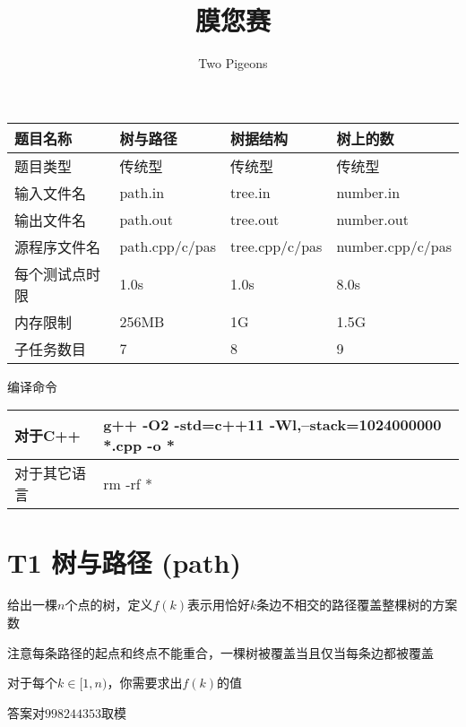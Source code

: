 \documentclass[12pt]{article}
\title{{\huge 膜您赛}}
\author{{\large Two Pigeons}}
\date{}
\begin{document}
\pagestyle{main}    %

	\begin{titlepage}
		\maketitle
		\begin{table}[!htbp]
			\centering
			\begin{tabular}{|p{3.5cm}|p{3.5cm}|p{3.5cm}|p{3.5cm}|}
				\hline
				题目名称 & 树与路径 & 树据结构 & 树上的数\\
				\hline
				题目类型 & 传统型 & 传统型 & 传统型\\
				\hline
				输入文件名 & path.in & tree.in & number.in\\
				\hline
				输出文件名 & path.out & tree.out & number.out\\
				\hline
				源程序文件名 & path.cpp/c/pas & tree.cpp/c/pas & number.cpp/c/pas\\
				\hline
				每个测试点时限 & 1.0s & 1.0s & 8.0s \\
				\hline
				内存限制 & 256MB & 1G & 1.5G \\
				\hline
				子任务数目 & 7 & 8 & 9 \\
				\hline
			\end{tabular}
		\end{table}
		编译命令
		\begin{table}[!htbp]
			\centering
			\begin{tabular}{|p{3.5cm}|p{11.3cm}<{\centering}|} 
				\hline
				对于C++ & \textsf{g++ -O2 -std=c++11 -Wl,--stack=1024000000 *.cpp -o *}\\
				\hline
				对于其它语言 & \textsf{rm -rf *}\\
				\hline
			\end{tabular}
		\end{table}
	\end{titlepage}
	\section{T1 树与路径 (path)}
	给出一棵$n$个点的树，定义$f(k)$表示用恰好$k$条边不相交的路径覆盖整棵树的方案数\par
	注意每条路径的起点和终点不能重合，一棵树被覆盖当且仅当每条边都被覆盖\par
	对于每个$k\in[1, n)$，你需要求出$f(k)$的值\par
	答案对$998244353$取模
\end{document}
